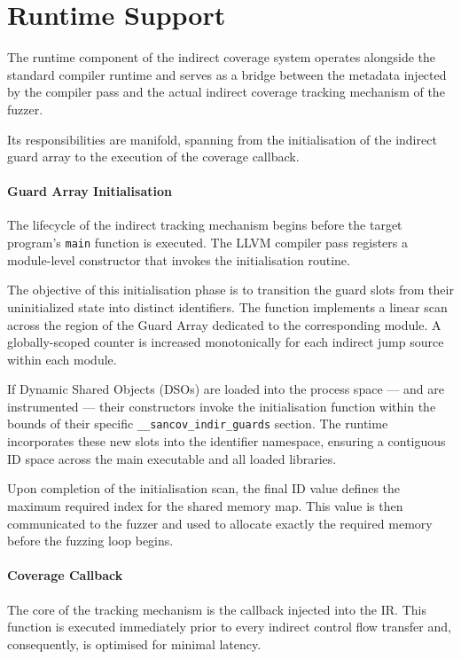 \section{Runtime Support}

The runtime component of the indirect coverage system operates alongside the standard compiler runtime and serves as a bridge between the metadata injected by the compiler pass and the actual indirect coverage tracking mechanism of the fuzzer.

Its responsibilities are manifold, spanning from the initialisation of the indirect guard array to the execution of the coverage callback.

\paragraph{Guard Array Initialisation} The lifecycle of the indirect tracking mechanism begins before the target program's \texttt{main} function is executed. The LLVM compiler pass registers a module-level constructor that invokes the initialisation routine.

The objective of this initialisation phase is to transition the guard slots from their uninitialized state into distinct identifiers. The function implements a linear scan across the region of the Guard Array dedicated to the corresponding module. A globally-scoped counter is increased monotonically for each indirect jump source within each module.

If Dynamic Shared Objects (DSOs) are loaded into the process space --- and are instrumented --- their constructors invoke the initialisation function within the bounds of their specific \texttt{\_\_sancov\_indir\_guards} section. The runtime incorporates these new slots into the identifier namespace, ensuring a contiguous ID space across the main executable and all loaded libraries.

Upon completion of the initialisation scan, the final ID value defines the maximum required index for the shared memory map. This value is then communicated to the fuzzer and used to allocate exactly the required memory before the fuzzing loop begins.

\paragraph{Coverage Callback} The core of the tracking mechanism is the callback injected into the IR. This function is executed immediately prior to every indirect control flow transfer and, consequently, is optimised for minimal latency.

